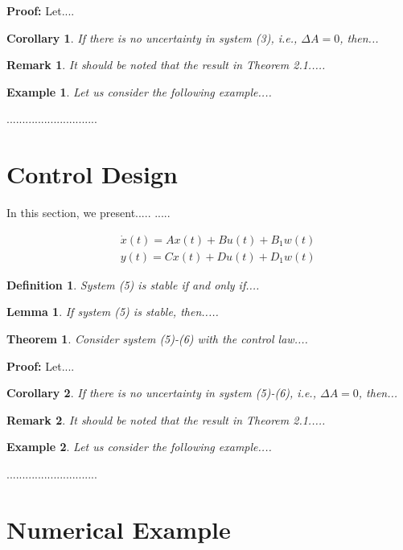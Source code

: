 \documentclass[12pt,a4paper]{icicel}
\newtheorem{corollary}{Corollary}[section]
\newtheorem{theorem}{Theorem}[section]
\newtheorem{lemma}{Lemma}[section]
\newtheorem{remark}{Remark}[section]
\newtheorem{definition}{Definition}[section]
\newtheorem{example}{Example}[section]
\begin{document}
{\bf Proof:} Let....

\begin{corollary}
If there is no uncertainty in system (3), i.e., $\Delta A=0$, then...
\end{corollary}

\begin{remark}
It should be noted that the result in Theorem 2.1.....
\end{remark}

\begin{example}
Let us consider the following example....
\end{example}
.............................

\section {Control Design}
In this section, we present.....
.....

\begin{eqnarray}
&&\dot x(t)=Ax(t)+Bu(t)+B_1w(t)\\
&&y(t)=Cx(t)+Du(t)+D_1w(t)
\end{eqnarray}

\begin{definition}
System (5) is stable if and only if....
\end{definition}

\begin{lemma}
If system (5) is stable, then.....
\end{lemma}

\begin{theorem}
Consider system (5)-(6) with the control law....
\end{theorem}

{\bf Proof:} Let....

\begin{corollary}
If there is no uncertainty in system (5)-(6), i.e., $\Delta A=0$, then...
\end{corollary}

\begin{remark}
It should be noted that the result in Theorem 2.1.....
\end{remark}

\begin{example}
Let us consider the following example....
\end{example}
.............................

\section{Numerical Example}
\end{document}
